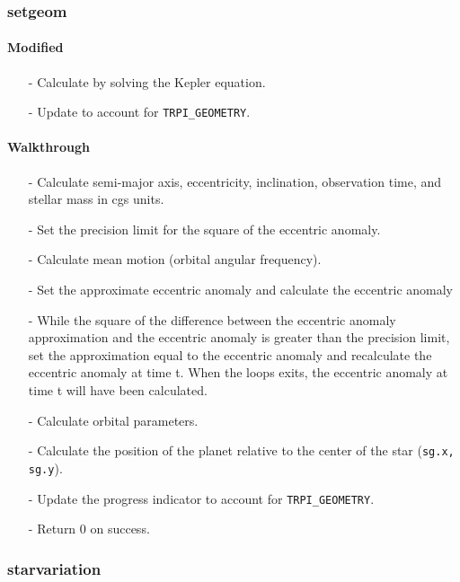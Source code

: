 \documentclass[letterpaper,12pt]{article}
\begin{document}
\subsubsection{setgeom}
\paragraph{Modified}
\begin{enumerate}[leftmargin=10pt, noitemsep, parsep=0pt, topsep=0ex]
\item[-] Calculate  by solving the Kepler equation.
\item[-] Update  to account for {\tt TRPI\_GEOMETRY}.
\end{enumerate}

\paragraph{Walkthrough}
\begin{enumerate}[leftmargin=10pt, noitemsep, parsep=0pt, topsep=0ex]
\item[-] Calculate semi-major axis, eccentricity, inclination, observation time, and stellar mass in cgs units.
\item[-] Set the precision limit for the square of the eccentric anomaly.
\item[-] Calculate mean motion (orbital angular frequency).
\item[-] Set the approximate eccentric anomaly and calculate the eccentric anomaly
\item[-] While the square of the difference between the eccentric anomaly approximation and the eccentric anomaly is greater than the precision limit, set the approximation equal to the eccentric anomaly and recalculate the eccentric anomaly at time t. When the loops exits, the eccentric anomaly at time t will have been calculated.
\item[-] Calculate orbital parameters.
\item[-] Calculate the position of the planet relative to the center of the star ({\tt sg.x, sg.y}).
\item[-] Update the progress indicator to account for {\tt TRPI\_GEOMETRY}.
\item[-] Return 0 on success.
\end{enumerate}

\subsubsection{starvariation}
\end{document}
